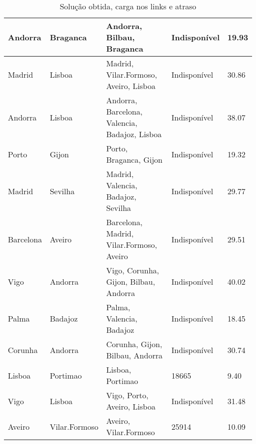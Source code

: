 \begin{table}[!htb]
{\begin{tabular}{|l|l|l|l|l|}
Andorra & Braganca & Andorra, Bilbau, Braganca & Indisponível & 19.93 \\ \hline
Madrid & Lisboa & Madrid, Vilar.Formoso, Aveiro, Lisboa & Indisponível & 30.86 \\ \hline
Andorra & Lisboa & Andorra, Barcelona, Valencia, Badajoz, Lisboa & Indisponível & 38.07 \\ \hline
Porto & Gijon & Porto, Braganca, Gijon & Indisponível & 19.32 \\ \hline
Madrid & Sevilha & Madrid, Valencia, Badajoz, Sevilha & Indisponível & 29.77 \\ \hline
Barcelona & Aveiro & Barcelona, Madrid, Vilar.Formoso, Aveiro & Indisponível & 29.51 \\ \hline
Vigo & Andorra & Vigo, Corunha, Gijon, Bilbau, Andorra & Indisponível & 40.02 \\ \hline
Palma & Badajoz & Palma, Valencia, Badajoz & Indisponível & 18.45 \\ \hline
Corunha & Andorra & Corunha, Gijon, Bilbau, Andorra & Indisponível & 30.74 \\ \hline
Lisboa & Portimao & Lisboa, Portimao & 18665 & 9.40 \\ \hline
Vigo & Lisboa & Vigo, Porto, Aveiro, Lisboa & Indisponível & 31.48 \\ \hline
Aveiro & Vilar.Formoso & Aveiro, Vilar.Formoso & 25914 & 10.09 \\ \hline
\end{tabular}}
\caption[]{Solução obtida, carga nos links e atraso}
\end{table}

